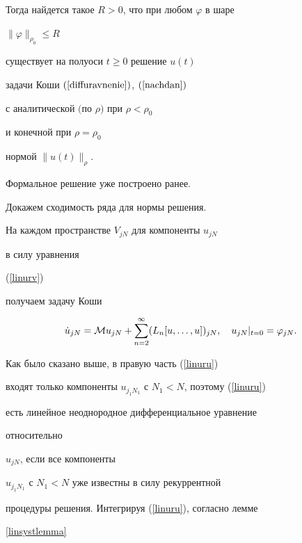 \begin{thm}
\begin{equation}
\end{equation}


Тогда найдется такое $R>0$, что при любом $\varphi$ в шаре


$\|\varphi\|_{\rho_0}\leq R$


существует на полуоси $t\geq 0$ решение $u(t)$


задачи Коши $(\ref{diffuravnenie})$, $(\ref{nachdan})$


с аналитической $($по $\rho)$ при $\rho<\rho_0$


и конечной при $\rho=\rho_0$


нормой $\|u(t)\|_{\rho}$.


\end{thm}





\begin{pf}


Формальное решение уже построено ранее.


Докажем сходимость ряда для нормы решения.


На каждом пространстве $V_{jN}$ для компоненты $u_{jN}$


в силу уравнения


(\ref{linurv})


получаем задачу Коши


\begin{equation}


\label{linuru}


\Dot u_{jN}={\cal{M}}u_{jN}+


\sum\limits_{n=2}^{\infty}


(L_n[u,\dotsc,u])_{jN},\quad


u_{jN}|_{t=0}=\varphi_{jN}.


\end{equation}


Как было сказано выше, в правую часть (\ref{linuru})


входят только компоненты $u_{j_1N_1}$ с $N_1<N$, поэтому (\ref{linuru})


есть линейное неоднородное дифференциальное уравнение


относительно


$u_{jN}$, если все компоненты


$u_{j_1N_1}$ с $N_1<N$ уже известны в силу рекуррентной


процедуры решения. Интегрируя (\ref{linuru}), согласно лемме


\ref{linsystlemma}



\end{pf}
